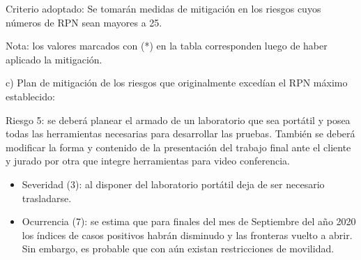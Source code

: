 \documentclass[11pt]{charter}
\begin{document}
Criterio adoptado: 
Se tomarán medidas de mitigación en los riesgos cuyos números de RPN sean mayores a 25.

Nota: los valores marcados con (*) en la tabla corresponden luego de haber aplicado la mitigación.

c) Plan de mitigación de los riesgos que originalmente excedían el RPN máximo establecido:
 
Riesgo 5: se deberá planear el armado de un laboratorio que sea portátil y posea todas las herramientas necesarias para desarrollar las pruebas. También se deberá modificar la forma y contenido de la presentación del trabajo final ante el cliente y jurado por otra que integre herramientas para video conferencia.
\begin{itemize}
	\item Severidad (3): al disponer del laboratorio portátil deja de ser necesario trasladarse.
	\item Ocurrencia (7): se estima que para finales del mes de Septiembre del año 2020 los índices de casos positivos habrán disminudo y las fronteras vuelto a abrir. Sin embargo, es probable que con aún existan restricciones de movilidad.
\end{itemize}
\end{document}
